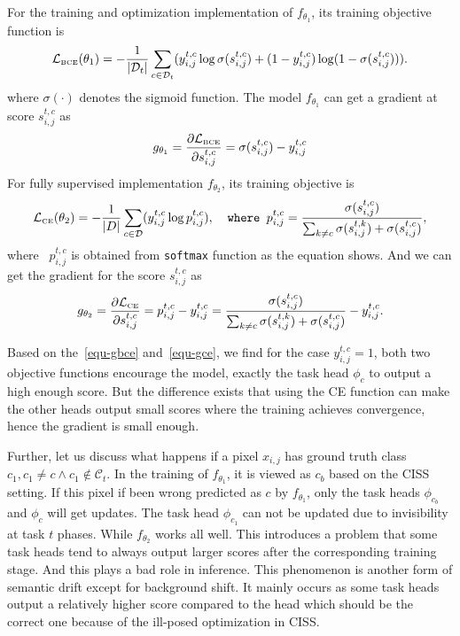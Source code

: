 For the training and optimization implementation of $f_{\theta_1}$, its training objective function is
\begin{equation}
        \mathcal{L}_{\text{\tiny BCE}}(\theta_1) = - \frac{1}{\left|\mathcal{D}_t\right|} \sum_{c\in\mathcal{D}_t} (y_{i,j}^{t,c} \log \sigma(s_{i,j}^{t,c}) + (1-y_{i,j}^{t,c}) \log (1-\sigma(s_{i,j}^{t,c}))).
\end{equation}
where $\sigma(\cdot)$ denotes the sigmoid function. The model $f_{\theta_1}$ can get a gradient at score $s_{i,j}^{t,c}$ as
\begin{equation}
\label{equ-gbce}
    g_{\theta_1} = \frac{\partial\mathcal{L}_{\text{\tiny BCE}}}{\partial s_{i,j}^{t, c}} = \sigma(s_{i,j}^{t,c}) - y_{i,j}^{t,c}
\end{equation}
For fully supervised implementation $f_{\theta_2}$, its training objective is
\begin{equation}
    \mathcal{L}_{\text{\tiny CE}}(\theta_2) = - \frac{1}{\left|D\right|} \sum_{c\in\mathcal{D}} (y_{i,j}^{t,c} \log p_{i,j}^{t,c}), \texttt{~~where~} p_{i,j}^{t,c} = \frac{\sigma(s_{i,j}^{t,c})}{\sum_{k\neq c} \sigma(s_{i,j}^{t,k}) + \sigma(s_{i,j}^{t,c})},
\end{equation}
where ~$p_{i,j}^{t,c}$ is obtained from \texttt{softmax} function as the equation shows. And we can get the gradient for the score $s_{i,j}^{t,c}$ as
\begin{equation}
\label{equ-gce}
    g_{\theta_2} = \frac{\partial\mathcal{L}_\text{\tiny CE}}{\partial s_{i,j}^{t, c}} = p_{i,j}^{t,c} - y_{i,j}^{t,c} = \frac{\sigma(s_{i,j}^{t,c})}{\sum_{k\neq c} \sigma(s_{i,j}^{t,k}) + \sigma(s_{i,j}^{t,c})} - y_{i,j}^{t,c}.
\end{equation}

Based on the~\cref{equ-gbce} and~\cref{equ-gce}, we find for the case $y_{i,j}^{t,c} = 1$, both two objective functions encourage the model, exactly the task head $\phi_c$ to output a high enough score. But the difference exists that using the CE function can make the other heads output small scores where the training achieves convergence, hence the gradient is small enough. 

Further, let us discuss what happens if a pixel $x_{i,j}$ has ground truth class $c_1, c_1 \neq c \land c_1 \notin \mathcal{C}_t$. In the training of $f_{\theta_1}$, it is viewed as $c_b$ based on the CISS setting. If this pixel if been wrong predicted as $c$ by $f_{\theta_1}$, only the task heads $\phi_{c_b}$ and $\phi_{c}$ will get updates. The task head $\phi_{c_1}$ can not be updated due to invisibility at task $t$ phases. While $f_{\theta_2}$ works all well. This introduces a problem that some task heads tend to always output larger scores after the corresponding training stage. And this plays a bad role in inference. This phenomenon is another form of semantic drift except for background shift. It mainly occurs as some task heads output a relatively higher score compared to the head which should be the correct one because of the ill-posed optimization in CISS.
\fi

